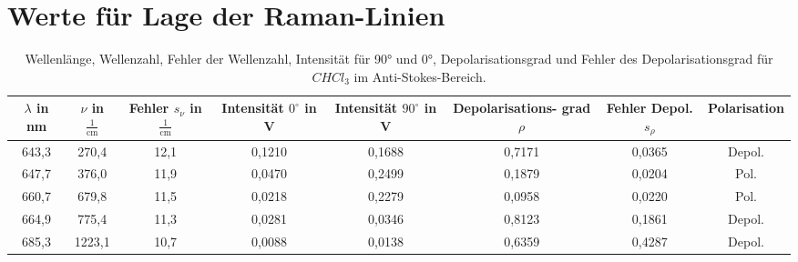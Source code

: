 \chapter{Werte für Lage der Raman-Linien}
\begin{table}[h]
    \centering
    \begin{tabular}{c||c|c|c|c|c|c|c}
      \makecell{ $\lambda$ \\in nm} & $\nu$ in $\frac{1}{\text{cm}}$  & \makecell{ Fehler \\ $s_{\nu}$ in $\frac{1}{\text{cm}}$} & \makecell{Intensität\\ $0^{\circ}$ in V}  &  \makecell{Intensität\\ $90^{\circ}$ in V}  & \makecell{ Depolarisations- \\ grad $\rho$}  & \makecell{ Fehler \\ Depol. $s_{\rho}$} & Polarisation \\
      \hline
      643,3 & 270,4 & 12,1  & 0,1210 & 0,1688 & 0,7171 & 0,0365 & Depol. \\
      647,7 & 376,0 & 11,9  & 0,0470 & 0,2499 & 0,1879 & 0,0204 & Pol. \\
      660,7 & 679,8 & 11,5  & 0,0218 & 0,2279 & 0,0958 & 0,0220 & Pol. \\
      664,9 & 775,4 & 11,3  & 0,0281 & 0,0346 & 0,8123 & 0,1861 & Depol. \\
      685,3 & 1223,1 & 10,7  & 0,0088 & 0,0138 & 0,6359 & 0,4287 & Depol. \\  
    \end{tabular}
    \caption{Wellenlänge, Wellenzahl, Fehler der Wellenzahl, Intensität für 90° und 0°, Depolarisationsgrad und Fehler des Depolarisationsgrad für $CHCl_3$ im Anti-Stokes-Bereich.}
\end{table}
